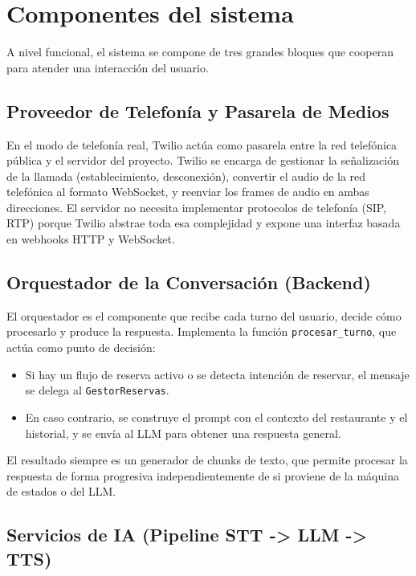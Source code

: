 \section{Componentes del sistema}
\label{sec:componentes_sistema}

A nivel funcional, el sistema se compone de tres grandes bloques que cooperan para atender una interacción del usuario.

\subsection{Proveedor de Telefonía y Pasarela de Medios}
\label{subsec:proveedor_telefonia}

En el modo de telefonía real, Twilio actúa como pasarela entre la red telefónica pública y el servidor del proyecto. Twilio se encarga de gestionar la señalización de la llamada (establecimiento, desconexión), convertir el audio de la red telefónica al formato WebSocket, y reenviar los frames de audio en ambas direcciones. El servidor no necesita implementar protocolos de telefonía (SIP, RTP) porque Twilio abstrae toda esa complejidad y expone una interfaz basada en webhooks HTTP y WebSocket.

\subsection{Orquestador de la Conversación (Backend)}
\label{subsec:orquestador_backend}

El orquestador es el componente que recibe cada turno del usuario, decide cómo procesarlo y produce la respuesta. Implementa la función \texttt{procesar\_turno}, que actúa como punto de decisión:

\begin{itemize}
    \item Si hay un flujo de reserva activo o se detecta intención de reservar, el mensaje se delega al \texttt{GestorReservas}.
    \item En caso contrario, se construye el prompt con el contexto del restaurante y el historial, y se envía al LLM para obtener una respuesta general.
\end{itemize}

El resultado siempre es un generador de chunks de texto, que permite procesar la respuesta de forma progresiva independientemente de si proviene de la máquina de estados o del LLM.

\subsection{Servicios de IA (Pipeline STT -> LLM -> TTS)}
\label{subsec:servicios_ia}

